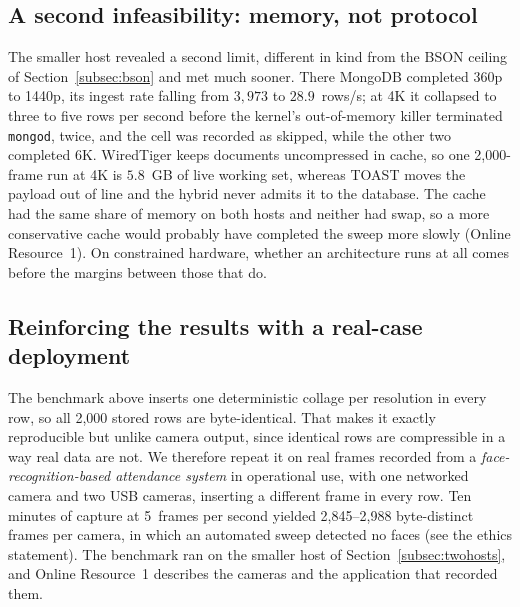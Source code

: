 \documentclass[pdflatex,sn-basic]{sn-jnl}%
\begin{document}
\subsection{A second infeasibility: memory, not protocol}\label{subsec:memory}
The smaller host revealed a second limit, different in kind from the BSON ceiling of Section~\ref{subsec:bson} and met much sooner. There MongoDB completed 360p to 1440p, its ingest rate falling from $3{,}973$ to $28.9$~rows/s; at 4K it collapsed to three to five rows per second before the kernel's out-of-memory killer terminated \texttt{mongod}, twice, and the cell was recorded as skipped, while the other two completed 6K. WiredTiger keeps documents uncompressed in cache, so one 2{,}000-frame run at 4K is $5.8$~GB of live working set, whereas TOAST moves the payload out of line and the hybrid never admits it to the database. The cache had the same share of memory on both hosts and neither had swap, so a more conservative cache would probably have completed the sweep more slowly (Online Resource~1). On constrained hardware, whether an architecture runs at all comes before the margins between those that do.

\subsection{Reinforcing the results with a real-case deployment}\label{subsec:realframes}
The benchmark above inserts one deterministic collage per resolution in every row, so all 2{,}000 stored rows are byte-identical. That makes it exactly reproducible but unlike camera output, since identical rows are compressible in a way real data are not. We therefore repeat it on real frames recorded from a \emph{face-recognition-based attendance system} in operational use, with one networked camera and two USB cameras, inserting a different frame in every row. Ten minutes of capture at 5~frames per second yielded 2{,}845--2{,}988 byte-distinct frames per camera, in which an automated sweep detected no faces (see the ethics statement). The benchmark ran on the smaller host of Section~\ref{subsec:twohosts}, and Online Resource~1 describes the cameras and the application that recorded them.
\end{document}
